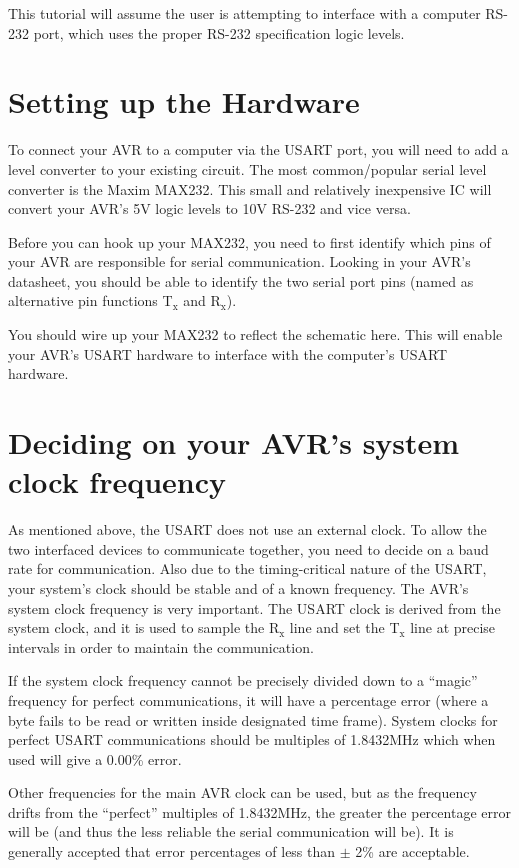 \documentclass[a4paper,oneside,notitlepage]{book}
\newcommand{\subscript}[1]{\ensuremath{_{\textrm{#1}}}}
\begin{document}
This tutorial will assume the user is attempting to interface with a computer RS-232 port, which uses the proper RS-232 specification logic levels.


\chapter{Setting up the Hardware}

To connect your AVR to a computer via the USART port, you will need to add a level converter to your existing circuit. The most common/popular serial level converter is the Maxim MAX232. This small and relatively inexpensive IC will convert your AVR's 5V logic levels to 10V RS-232 and vice versa.

Before you can hook up your MAX232, you need to first identify which pins of your AVR are responsible for serial communication. Looking in your AVR's datasheet, you should be able to identify the two serial port pins (named as alternative pin functions T\subscript{x} and R\subscript{x}).

You should wire up your MAX232 to reflect the schematic here. This will enable your AVR's USART hardware to interface with the computer's USART hardware.


\chapter{Deciding on your AVR's system clock frequency}

As mentioned above, the USART does not use an external clock. To allow the two interfaced devices to communicate together, you need to decide on a baud rate for communication. Also due to the timing-critical nature of the USART, your system's clock should be stable and of a known frequency. The AVR's system clock frequency is very important. The USART clock is derived from the system clock, and it is used to sample the R\subscript{x} line and set the T\subscript{x} line at precise intervals in order to maintain the communication.

If the system clock frequency cannot be precisely divided down to a ``magic'' frequency for perfect communications, it will have a percentage error (where a byte fails to be read or written inside designated time frame). System clocks for perfect USART communications should be multiples of 1.8432MHz which when used will give a 0.00\% error.

Other frequencies for the main AVR clock can be used, but as the frequency drifts from the ``perfect'' multiples of 1.8432MHz, the greater the percentage error will be (and thus the less reliable the serial communication will be). It is generally accepted that error percentages of less than \ensuremath{\pm} 2\% are acceptable.
\end{document}

